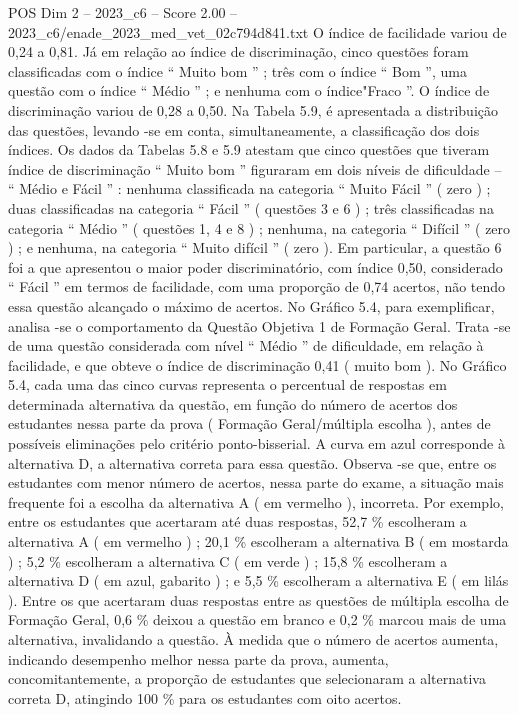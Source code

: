 \begin{textsample}{POS Dim 2 – 2023\_c6 – Score 2.00 – 2023\_c6/enade\_2023\_med\_vet\_02c794d841.txt}
O índice de facilidade variou de 0,24 a 0,81.
Já em relação ao índice de discriminação, cinco questões foram classificadas com o índice “ Muito bom ” ; três com o índice “ Bom ”, uma questão com o índice “ Médio ” ; e nenhuma com o índice"Fraco ”.
O índice de discriminação variou de 0,28 a 0,50.
Na Tabela 5.9, é apresentada a distribuição das questões, levando -se em conta, simultaneamente, a classificação dos dois índices.
Os dados da Tabelas 5.8 e 5.9 atestam que cinco questões que tiveram índice de discriminação “ Muito bom ” figuraram em dois níveis de dificuldade – “ Médio e Fácil ” : nenhuma classificada na categoria “ Muito Fácil ” ( zero ) ; duas classificadas na categoria “ Fácil ” ( questões 3 e 6 ) ; três classificadas na categoria “ Médio ” ( questões 1, 4 e 8 ) ; nenhuma, na categoria “ Difícil ” ( zero ) ; e nenhuma, na categoria “ Muito difícil ” ( zero ).
Em particular, a questão 6 foi a que apresentou o maior poder discriminatório, com índice 0,50, considerado “ Fácil ” em termos de facilidade, com uma proporção de 0,74 acertos, não tendo essa questão alcançado o máximo de acertos.
No Gráfico 5.4, para exemplificar, analisa -se o comportamento da Questão Objetiva 1 de Formação Geral.
Trata -se de uma questão considerada com nível “ Médio ” de dificuldade, em relação à facilidade, e que obteve o índice de discriminação 0,41 ( muito bom ).
No Gráfico 5.4, cada uma das cinco curvas representa o percentual de respostas em determinada alternativa da questão, em função do número de acertos dos estudantes nessa parte da prova ( Formação Geral/múltipla escolha ), antes de possíveis eliminações pelo critério ponto-bisserial.
A curva em azul corresponde à alternativa D, a alternativa correta para essa questão.
Observa -se que, entre os estudantes com menor número de acertos, nessa parte do exame, a situação mais frequente foi a escolha da alternativa A ( em vermelho ), incorreta.
Por exemplo, entre os estudantes que acertaram até duas respostas, 52,7 \% escolheram a alternativa A ( em vermelho ) ; 20,1 \% escolheram a alternativa B ( em mostarda ) ; 5,2 \% escolheram a alternativa C ( em verde ) ; 15,8 \% escolheram a alternativa D ( em azul, gabarito ) ; e 5,5 \% escolheram a alternativa E ( em lilás ).
Entre os que acertaram duas respostas entre as questões de múltipla escolha de Formação Geral, 0,6 \% deixou a questão em branco e 0,2 \% marcou mais de uma alternativa, invalidando a questão.
À medida que o número de acertos aumenta, indicando desempenho melhor nessa parte da prova, aumenta, concomitantemente, a proporção de estudantes que selecionaram a alternativa correta D, atingindo 100 \% para os estudantes com oito acertos.

\end{textsample}
